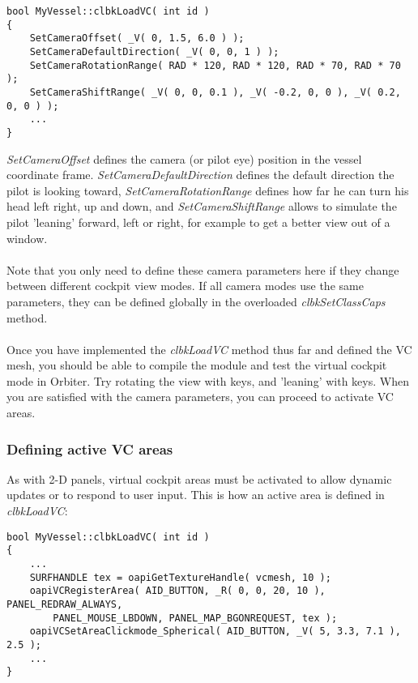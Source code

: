 \documentclass[Orbiter Developer Manual.tex]{subfiles}
\begin{document}
\begin{lstlisting}
bool MyVessel::clbkLoadVC( int id )
{
	SetCameraOffset( _V( 0, 1.5, 6.0 ) );
	SetCameraDefaultDirection( _V( 0, 0, 1 ) );
	SetCameraRotationRange( RAD * 120, RAD * 120, RAD * 70, RAD * 70 );
	SetCameraShiftRange( _V( 0, 0, 0.1 ), _V( -0.2, 0, 0 ), _V( 0.2, 0, 0 ) );
	...
}
\end{lstlisting}

\noindent
\textit{SetCameraOffset} defines the camera (or pilot eye) position in the vessel coordinate frame. \textit{SetCameraDefaultDirection} defines the default direction the pilot is looking toward, \textit{SetCameraRotationRange} defines how far he can turn his head left right, up and down, and \textit{SetCameraShiftRange} allows to simulate the pilot 'leaning' forward, left or right, for example to get a better view out of a window.\\
\\
Note that you only need to define these camera parameters here if they change between different cockpit view modes. If all camera modes use the same parameters, they can be defined globally in the overloaded \textit{clbkSetClassCaps} method.\\
\\
Once you have implemented the \textit{clbkLoadVC} method thus far and defined the VC mesh, you should be able to compile the module and test the virtual cockpit mode in Orbiter. Try rotating the view with \Alt\DArrow\UArrow\RArrow\LArrow keys, and 'leaning' with \Ctrl\Alt\DArrow\UArrow\RArrow\LArrow keys. When you are satisfied with the camera parameters, you can proceed to activate VC areas.


\subsubsection{Defining active VC areas}
As with 2-D panels, virtual cockpit areas must be activated to allow dynamic updates or to respond to user input. This is how an active area is defined in \textit{clbkLoadVC}:

\begin{lstlisting}
bool MyVessel::clbkLoadVC( int id )
{
	...
	SURFHANDLE tex = oapiGetTextureHandle( vcmesh, 10 );
	oapiVCRegisterArea( AID_BUTTON, _R( 0, 0, 20, 10 ), PANEL_REDRAW_ALWAYS,
		PANEL_MOUSE_LBDOWN, PANEL_MAP_BGONREQUEST, tex );
	oapiVCSetAreaClickmode_Spherical( AID_BUTTON, _V( 5, 3.3, 7.1 ), 2.5 );
	...
}
\end{lstlisting}
\end{document}
